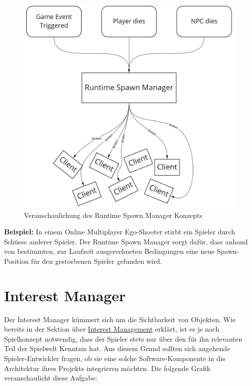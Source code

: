 \begin{figure}[H]
	\centering
	\includegraphics[width=150mm]{images/Runtime_Spawn_Manager.jpg}
	\caption[Runtime Spawn Manager]{Veranschaulichung des Runtime Spawn Manager Konzepts}
	\label{pic:Runtime_Spawn_Manager}
\end{figure}

\textbf{Beispiel:} In einem Online Multiplayer Ego-Shooter \cite{Wikipedia.2021g} stirbt ein Spieler durch Schüsse anderer Spieler. Der Runtime Spawn Manager sorgt dafür, dass anhand von bestimmten, zur Laufzeit ausgerechneten Bedingungen eine neue Spawn-Position für den gestorbenen Spieler gefunden wird. 


\section{Interest Manager}

Der Interest Manager kümmert sich um die Sichtbarkeit von Objekten. Wie bereits in der Sektion über \hyperref[interest_management]{Interest Management} erklärt, ist es je nach Spielkonzept notwendig, dass der Spieler stets nur über den für ihn relevanten Teil der Spielwelt Kenntnis hat. Aus diesem Grund sollten sich angehende Spieler-Entwickler fragen, ob sie eine solche Software-Komponente in die Architektur ihres Projekts integrieren möchten. Die folgende Grafik veranschaulicht diese Aufgabe:

